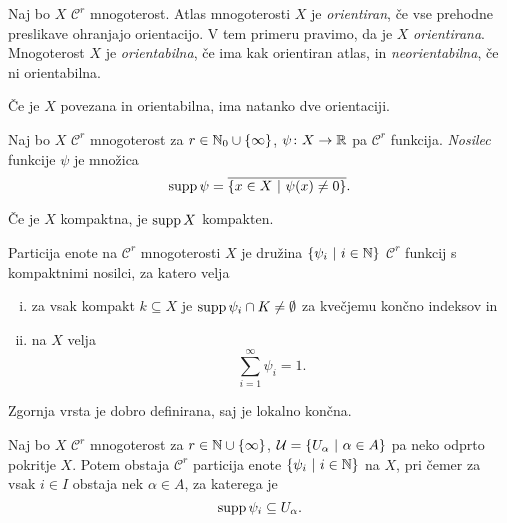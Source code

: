 \begin{definicija}
Naj bo $X$ $\mathcal{C}^r$ mnogoterost. Atlas mnogoterosti $X$ je
\emph{orientiran}, če vse prehodne preslikave ohranjajo
orientacijo. V tem primeru pravimo, da je $X$
\emph{orientirana}. Mnogoterost $X$
je \emph{orientabilna}, če ima kak orientiran atlas, in
\emph{neorientabilna}, če ni orientabilna.
\end{definicija}

\begin{opomba}
Če je $X$ povezana in orientabilna, ima natanko dve orientaciji.
\end{opomba}

\begin{definicija}
Naj bo $X$ $\mathcal{C}^r$ mnogoterost za
$r \in \mathbb{N}_0 \cup \left\{\infty\right\}$, $\psi \colon X \to \mathbb{R}$ pa
$\mathcal{C}^r$ funkcija. \emph{Nosilec}
funkcije $\psi$ je množica
\[
\operatorname{supp} \psi = \overline{\left\{x \in X~\middle\vert~\psi(x) \ne 0\right\}}.
\]
\end{definicija}

\begin{opomba}
Če je $X$ kompaktna, je $\operatorname{supp} X$ kompakten.
\end{opomba}

\begin{definicija}
Particija enote na $\mathcal{C}^r$ mnogoterosti $X$ je družina
$\left\{\psi_i~\middle\vert~i \in \mathbb{N}\right\}$ $\mathcal{C}^r$ funkcij s kompaktnimi
nosilci, za katero velja

\begin{enumerate}[i)]
\item za vsak kompakt $k \subseteq X$ je
$\operatorname{supp} \psi_i \cap K \ne \emptyset$ za kvečjemu končno indeksov in
\item na $X$ velja
\[
\sum_{i=1}^\infty \psi_i = 1.
\]
\end{enumerate}
\end{definicija}

\begin{opomba}
Zgornja vrsta je dobro definirana, saj je lokalno končna.
\end{opomba}

\begin{izrek}
Naj bo $X$ $\mathcal{C}^r$ mnogoterost za
$r \in \mathbb{N} \cup \left\{\infty\right\}$,
$\mathcal{U} = \left\{U_\alpha~\middle\vert~\alpha \in A\right\}$ pa neko odprto
pokritje $X$. Potem obstaja $\mathcal{C}^r$ particija enote
$\left\{\psi_i~\middle\vert~i \in \mathbb{N}\right\}$ na $X$, pri čemer za vsak $i \in I$
obstaja nek $\alpha \in A$, za katerega je
\[
\operatorname{supp} \psi_i \subseteq U_\alpha.
\]
\end{izrek}

